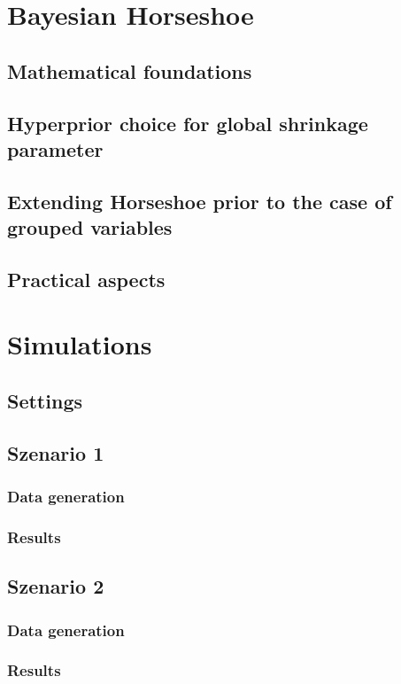 \documentclass[12pt,letterpaper]{article}
\begin{document}
\section{Bayesian Horseshoe}
\subsection{Mathematical foundations}
\subsection{Hyperprior choice for global shrinkage parameter}
\subsection{Extending Horseshoe prior to the case of grouped variables}
\label{sec:gHSP}
\subsection{Practical aspects}
\pagebreak

\section{Simulations}
\subsection{Settings}

\subsection{Szenario 1}
\subsubsection{Data generation}
\subsubsection{Results}
\subsection{Szenario 2}
\subsubsection{Data generation}
\subsubsection{Results}
\end{document}
